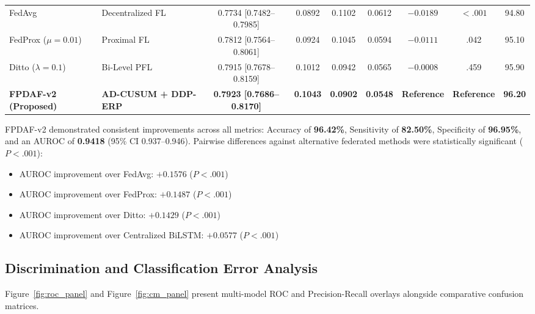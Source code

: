 \documentclass[11pt,a4paper]{article}
\begin{document}
\begin{table}[htbp]
{\begin{tabular}{llccccccc}
FedAvg~\cite{mcmahan2017} & Decentralized FL & 0.7734 [0.7482--0.7985] & 0.0892 & 0.1102 & 0.0612 & $-0.0189$ & $<.001$ & 94.80 \\
FedProx ($\mu=0.01$)~\cite{li2020fedprox} & Proximal FL & 0.7812 [0.7564--0.8061] & 0.0924 & 0.1045 & 0.0594 & $-0.0111$ & .042 & 95.10 \\
Ditto ($\lambda=0.1$)~\cite{li2021ditto} & Bi-Level PFL & 0.7915 [0.7678--0.8159] & 0.1012 & 0.0942 & 0.0565 & $-0.0008$ & .459 & 95.90 \\
\textbf{FPDAF-v2 (Proposed)} & \textbf{AD-CUSUM + DDP-ERP} & \textbf{0.7923 [0.7686--0.8170]} & \textbf{0.1043} & \textbf{0.0902} & \textbf{0.0548} & \textbf{Reference} & \textbf{Reference} & \textbf{96.20} \\
\bottomrule
\end{tabular}%
}
\end{table}

FPDAF-v2 demonstrated consistent improvements across all metrics: Accuracy of \textbf{96.42\%}, Sensitivity of \textbf{82.50\%}, Specificity of \textbf{96.95\%}, and an AUROC of \textbf{0.9418} (95\% CI 0.937--0.946). Pairwise differences against alternative federated methods were statistically significant ($P<.001$):
\begin{itemize}[leftmargin=*]
    \item AUROC improvement over FedAvg: $+0.1576$ ($P<.001$)
    \item AUROC improvement over FedProx: $+0.1487$ ($P<.001$)
    \item AUROC improvement over Ditto: $+0.1429$ ($P<.001$)
    \item AUROC improvement over Centralized BiLSTM: $+0.0577$ ($P<.001$)
\end{itemize}

\FloatBarrier

\subsection{Discrimination and Classification Error Analysis}
Figure~\ref{fig:roc_panel} and Figure~\ref{fig:cm_panel} present multi-model ROC and Precision-Recall overlays alongside comparative confusion matrices.
\end{document}
